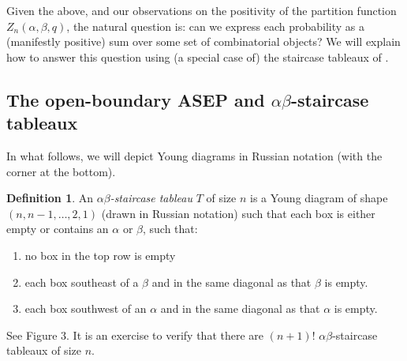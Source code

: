 \documentclass[11pt]{amsart}
\theoremstyle{definition}
\newtheorem{definition}[theorem]{Definition}
\theoremstyle{remark}
\begin{document}
Given the above, and 
our observations on the positivity of the partition function $Z_n(\alpha,\beta,q)$,
the natural question is:
can we express each probability
as a (manifestly positive) sum over some set of combinatorial objects?
We will explain how to answer this question using (a special case of) 
the staircase
tableaux of \cite{CW4}.

\subsection{The open-boundary ASEP and $\alpha \beta$-staircase tableaux}
In what follows,
we will depict Young diagrams
in Russian notation (with the corner at the bottom).  

\begin{definition}
		An  \emph{$\alpha \beta$-staircase tableau} $T$ of size $n$ is a 
Young diagram of shape $(n, n-1, \dots, 2, 1)$ 
(drawn in Russian notation)
such that each box is either empty
or contains an $\alpha$ or $\beta$, such that:
\begin{enumerate}
\item no box in the top row is empty
\item each box southeast of a $\beta$ and in the same diagonal
 as that $\beta$ is empty.
 \item each box southwest of an $\alpha$ and in the same diagonal
 as that $\alpha$ is empty.
\end{enumerate}
\end{definition}

See Figure 3.
It is an exercise to verify that %
there are  $(n+1)!$ $\alpha \beta$-staircase tableaux
of size $n$.
\end{document}
